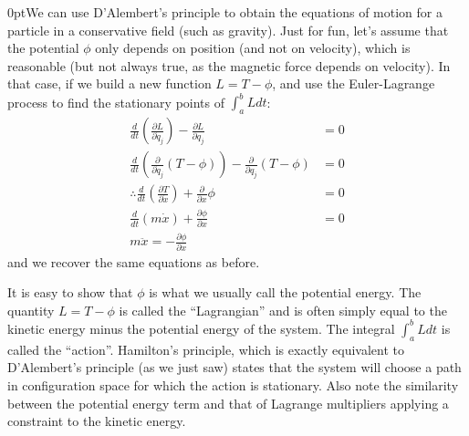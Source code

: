 \begin{example}{0pt}{We can use D'Alembert's principle to obtain the equations of motion for a particle in a conservative field (such as gravity).}{}
Just for fun, let's assume that the potential $\phi$ only depends on position (and not on velocity), which is reasonable (but not always true, as the magnetic force depends on velocity). In that case, if we build a new function $L=T-\phi$, and use the Euler-Lagrange process to find the stationary points of $\int_a^b L dt$:
\begin{align*}
\frac{d}{dt}\left(\frac{\partial L}{\partial \dot{q}_j}  \right) - \frac{\partial L}{\partial q_j} &=0\nonumber\\
\frac{d}{dt}\left(\frac{\partial}{\partial \dot{q}_j} (T-\phi) \right) - \frac{\partial }{\partial q_j} (T-\phi)&=0\nonumber\\
\therefore\frac{d}{dt}\left(\frac{\partial T}{\partial \dot{x}} \right) + \frac{\partial}{\partial x}\phi&=0\nonumber\\
\frac{d}{dt}\left(m\dot{x} \right)+\frac{\partial \phi}{\partial x}&=0\nonumber\\
m\ddot{x}=-\frac{\partial \phi}{\partial x}\nonumber
\end{align*}
and we recover the same equations as before.

It is easy to show that $\phi$ is what we usually call the potential energy. The quantity $L=T-\phi$ is called the ``Lagrangian'' and is often simply equal to the kinetic energy minus the potential energy of the system. The integral $\int_a^b L dt$ is called the ``action''. Hamilton's principle, which is exactly equivalent to D'Alembert's principle (as we just saw) states that the system will choose a path in configuration space for which the action is stationary. Also note the similarity between the potential energy term and that of Lagrange multipliers applying a constraint to the kinetic energy.
\label{ex:dalembpart}
\end{example}


